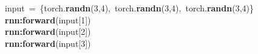 \noindent
\mbox{}input\ =\ \{torch.\textbf{randn}(3,4),\ torch.\textbf{randn}(3,4),\ torch.\textbf{randn}(3,4)\} \\
\mbox{}\textbf{rnn:forward}(input[1]) \\
\mbox{}\textbf{rnn:forward}(input[2]) \\
\mbox{}\textbf{rnn:forward}(input[3])

